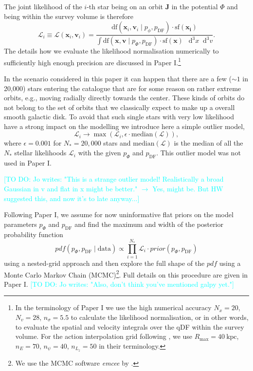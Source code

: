 \documentclass[iop,revtex4,numberedappendix,appendixfloats]{emulateapj}
\newcommand{\vect}[1]{\boldsymbol{#1}}
\newcommand*\Diff[1]{\mathop{}\!\mathrm{d^#1}}
\newcommand{\pdf}{\ensuremath{pdf}}
\newcommand{\Jo}[1]{\textcolor{Cyan}{#1}}
\begin{document}
The joint likelihood of the $i$-th star being on an orbit $\vect{J}$ in the potential $\Phi$ and being within the survey volume is therefore
\begin{equation*}
\mathscr{L}_i \equiv \mathscr{L}(\vect{x}_i,\vect{v}_i) = \frac{\text{df}(\vect{x}_i,\vect{v}_i\mid p_\phi, p_\text{DF}) \cdot \text{sf}(\vect{x_i})}{\int \text{df}(\vect{x},\vect{v}\mid p_\Phi, p_\text{DF}) \cdot \text{sf}(\vect{x}) \ \Diff3 x \Diff3 v}.
\end{equation*}
The details how we evaluate the likelihood normalisation numerically to sufficiently high enough precision are discussed in Paper I.\footnote{In the terminology of Paper I we use the high numerical accuracy $N_x = 20$, $N_v = 28$, $n_\sigma = 5.5$ to calculate the likelihood normalisation, or in other words, to evaluate the spatial and velocity integrals over the qDF within the survey volume. For the action interpolation grid following \citet{2015ApJS..216...29B}, we use $R_\text{max}=40~\text{kpc}$, $n_E=70$, $n_\psi=40$, $n_{L_z}=50$ in their terminology.}

In the scenario considered in this paper it can happen that there are a few ($\sim 1$ in 20,000) stars entering the catalogue that are for some reason  on rather extreme orbits, e.g., moving radially directly towards the center. These kinds of orbits do not belong to the set of orbits that we classically expect to make up a overall smooth galactic disk. To avoid that such single stars with very low likelihood have a strong impact on the modelling we introduce here a simple outlier model,
\begin{equation*}
\mathscr{L}_i \longrightarrow \max \left( \mathscr{L}_i, \epsilon \cdot \text{median}(\mathscr{L})\right),
\end{equation*}
where $\epsilon = 0.001$ for $N_*=20,000$ stars and $\text{median}(\mathscr{L})$ is the median of all the $N_*$ stellar likelihoods $\mathscr{L}_i$ with the given $p_\Phi$ and $p_\text{DF}$. This outlier model was not used in Paper I.

\Jo{[TO DO: Jo writes: "This is a strange outlier model! Realistically a broad Gaussian in v and flat in x might be better." $\longrightarrow$ Yes, might be. But HW suggested this, and now it's to late anyway...]}

Following Paper I, we assume for now uninformative flat priors on the model parameters $p_\Phi$ and $p_\text{DF}$ and find the maximum and width of the posterior probability function
\begin{equation*}
pdf(p_\Phi,p_\text{DF} \mid \text{data}) \propto \prod_{i=1}^{N_*} \mathscr{L}_i \cdot prior(p_\Phi,p_\text{DF})
\end{equation*}
using a nested-grid approach and then explore the full shape of the $\pdf$ using a Monte Carlo Markov Chain (MCMC)\footnote{We use the MCMC software \emph{emcee} by \citet{2013PASP..125..306F}.}. Full details on this procedure are given in Paper I. \Jo{[TO DO: Jo writes: "Also, don't think you've mentioned galpy yet."]}
\end{document}
